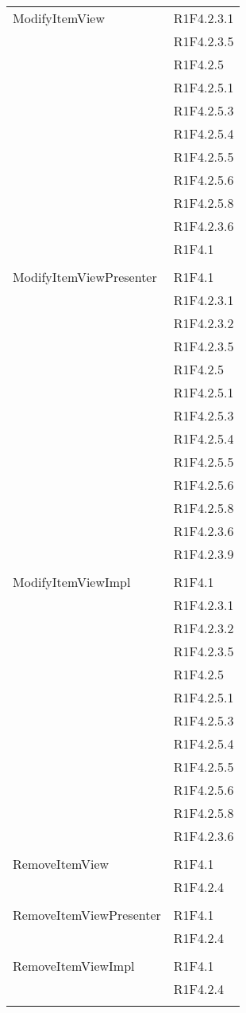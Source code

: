 \begin{center}
\begin{longtable}{|p{7cm}|p{7cm}|}
		ModifyItemView & R1F4.2.3.1 \\ & R1F4.2.3.5 \\ & R1F4.2.5 \\ & R1F4.2.5.1 \\ & R1F4.2.5.3 \\ & R1F4.2.5.4 \\ & R1F4.2.5.5 \\ & R1F4.2.5.6 \\ & R1F4.2.5.8 \\ & R1F4.2.3.6 \\ & R1F4.1 \\ & \\ \hline
		ModifyItemViewPresenter & R1F4.1 \\ & R1F4.2.3.1 \\ & R1F4.2.3.2 \\ & R1F4.2.3.5 \\ & R1F4.2.5 \\ & R1F4.2.5.1 \\ & R1F4.2.5.3 \\ & R1F4.2.5.4 \\ & R1F4.2.5.5 \\ & R1F4.2.5.6 \\ & R1F4.2.5.8 \\ & R1F4.2.3.6 \\ & R1F4.2.3.9 \\ & \\ \hline
		ModifyItemViewImpl & R1F4.1 \\ & R1F4.2.3.1 \\ & R1F4.2.3.2 \\ & R1F4.2.3.5 \\ & R1F4.2.5 \\ & R1F4.2.5.1 \\ & R1F4.2.5.3 \\ & R1F4.2.5.4 \\ & R1F4.2.5.5 \\ & R1F4.2.5.6 \\ & R1F4.2.5.8 \\ & R1F4.2.3.6 \\ & \\ \hline
		RemoveItemView & R1F4.1 \\ & R1F4.2.4 \\ & \\ \hline
		RemoveItemViewPresenter & R1F4.1 \\ & R1F4.2.4 \\ & \\ \hline
		RemoveItemViewImpl & R1F4.1 \\ & R1F4.2.4 \\ & \\ \hline

\end{longtable}
\end{center}
